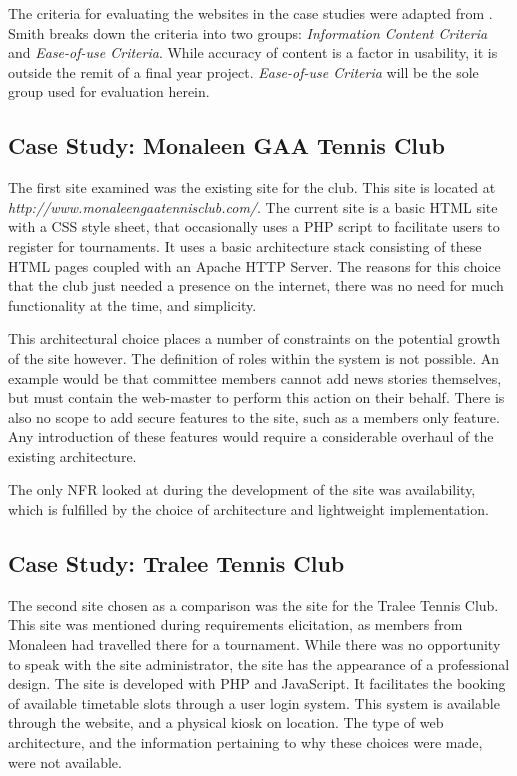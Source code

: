 The criteria for evaluating the websites in the case studies were adapted from \cite{smith2001applying}. Smith breaks down the criteria into two groups: \textit{Information Content Criteria} and \textit{Ease-of-use Criteria}. While accuracy of content is a factor in usability, it is outside the remit of a final year project. \textit{Ease-of-use Criteria} will be the sole group used for evaluation herein. 


\subsection{Case Study: Monaleen GAA Tennis Club}

The first site examined was the existing site for the club. This site is located at \newline\textit{http://www.monaleengaatennisclub.com/}. The current site is a basic HTML site with a CSS style sheet, that occasionally uses a PHP script to facilitate users to register for tournaments. It uses a basic architecture stack consisting of these HTML pages coupled with an Apache HTTP Server. The reasons for this choice that the club just needed a presence on the internet, there was no need for much functionality at the time, and simplicity.

This architectural choice places a number of constraints on the potential growth of the site however. The definition of roles within the system is not possible. An example would be that committee members cannot add news stories themselves, but must contain the web-master to perform this action on their behalf. There is also no scope to add secure features to the site, such as a members only feature. Any introduction of these features would require a considerable overhaul of the existing architecture.

The only NFR looked at during the development of the site was availability, which is fulfilled by the choice of architecture and lightweight implementation. 

\subsection{Case Study: Tralee Tennis Club}

The second site chosen as a comparison was the site for the Tralee Tennis Club. This site was mentioned during requirements elicitation, as members from Monaleen had travelled there for a tournament. While there was no opportunity to speak with the site administrator, the site has the appearance of a professional design. The site is developed with PHP and JavaScript. It facilitates the booking of available timetable slots through a user login system. This system is available through the website, and a physical kiosk on location. The type of web architecture, and the information pertaining to why these choices were made, were not available.  

